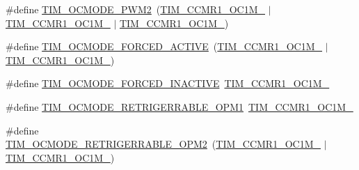 \begin{DoxyCompactItemize}
\item 
\#define \mbox{\hyperlink{group___t_i_m___output___compare__and___p_w_m__modes_ga88ce4251743c2c07e19fdd5a0a310580}{T\+I\+M\+\_\+\+O\+C\+M\+O\+D\+E\+\_\+\+P\+W\+M2}}~(\mbox{\hyperlink{group___peripheral___registers___bits___definition_gac024f6b9972b940925ab5786ee38701b}{T\+I\+M\+\_\+\+C\+C\+M\+R1\+\_\+\+O\+C1\+M\+\_}} $\vert$ \mbox{\hyperlink{group___peripheral___registers___bits___definition_ga8b5f6ec25063483641d6dc065d96d2b5}{T\+I\+M\+\_\+\+C\+C\+M\+R1\+\_\+\+O\+C1\+M\+\_}} $\vert$ \mbox{\hyperlink{group___peripheral___registers___bits___definition_ga410a4752a98081bad8ab3f72b28e7c5f}{T\+I\+M\+\_\+\+C\+C\+M\+R1\+\_\+\+O\+C1\+M\+\_}})
\item 
\#define \mbox{\hyperlink{group___t_i_m___output___compare__and___p_w_m__modes_ga0a78cecaf884a89963e2a8e6af7e6128}{T\+I\+M\+\_\+\+O\+C\+M\+O\+D\+E\+\_\+\+F\+O\+R\+C\+E\+D\+\_\+\+A\+C\+T\+I\+VE}}~(\mbox{\hyperlink{group___peripheral___registers___bits___definition_gac024f6b9972b940925ab5786ee38701b}{T\+I\+M\+\_\+\+C\+C\+M\+R1\+\_\+\+O\+C1\+M\+\_}} $\vert$ \mbox{\hyperlink{group___peripheral___registers___bits___definition_ga410a4752a98081bad8ab3f72b28e7c5f}{T\+I\+M\+\_\+\+C\+C\+M\+R1\+\_\+\+O\+C1\+M\+\_}})
\item 
\#define \mbox{\hyperlink{group___t_i_m___output___compare__and___p_w_m__modes_ga4572f724ce30ce45557f1dc5141afb3e}{T\+I\+M\+\_\+\+O\+C\+M\+O\+D\+E\+\_\+\+F\+O\+R\+C\+E\+D\+\_\+\+I\+N\+A\+C\+T\+I\+VE}}~\mbox{\hyperlink{group___peripheral___registers___bits___definition_gac024f6b9972b940925ab5786ee38701b}{T\+I\+M\+\_\+\+C\+C\+M\+R1\+\_\+\+O\+C1\+M\+\_}}
\item 
\#define \mbox{\hyperlink{group___t_i_m___output___compare__and___p_w_m__modes_ga53168a4498dcb4956d9f84419a20841c}{T\+I\+M\+\_\+\+O\+C\+M\+O\+D\+E\+\_\+\+R\+E\+T\+R\+I\+G\+E\+R\+R\+A\+B\+L\+E\+\_\+\+O\+P\+M1}}~\mbox{\hyperlink{group___peripheral___registers___bits___definition_gac93dfe7865726bc84363684b9fa01c93}{T\+I\+M\+\_\+\+C\+C\+M\+R1\+\_\+\+O\+C1\+M\+\_}}
\item 
\#define \mbox{\hyperlink{group___t_i_m___output___compare__and___p_w_m__modes_ga83f39ecc55403f37e930e6f14cb6cc76}{T\+I\+M\+\_\+\+O\+C\+M\+O\+D\+E\+\_\+\+R\+E\+T\+R\+I\+G\+E\+R\+R\+A\+B\+L\+E\+\_\+\+O\+P\+M2}}~(\mbox{\hyperlink{group___peripheral___registers___bits___definition_gac93dfe7865726bc84363684b9fa01c93}{T\+I\+M\+\_\+\+C\+C\+M\+R1\+\_\+\+O\+C1\+M\+\_}} $\vert$ \mbox{\hyperlink{group___peripheral___registers___bits___definition_ga410a4752a98081bad8ab3f72b28e7c5f}{T\+I\+M\+\_\+\+C\+C\+M\+R1\+\_\+\+O\+C1\+M\+\_}})

\end{DoxyCompactItemize}
